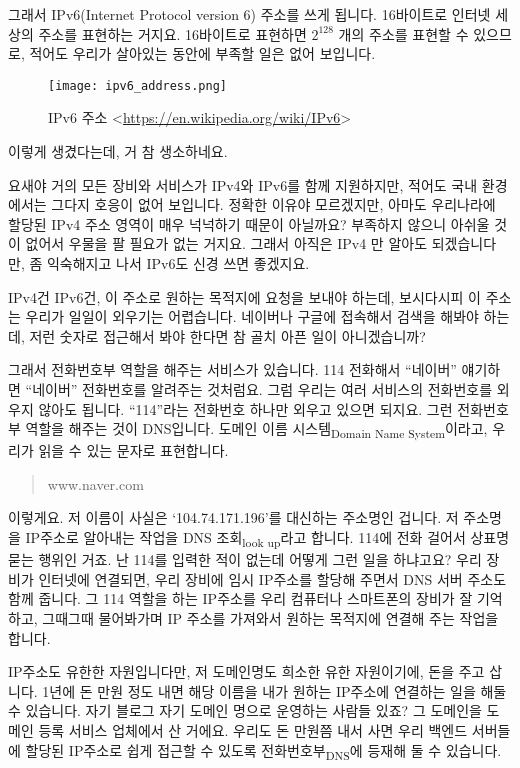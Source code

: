 \documentclass[11pt,a4paper]{article}
\begin{document}
그래서 IPv6(Internet Protocol version 6) 주소를 쓰게 됩니다. 16바이트로 인터넷 세상의 주소를 표현하는 거지요. 16바이트로 표현하면 $2^{128}$ 개의 주소를 표현할 수 있으므로, 적어도 우리가 살아있는 동안에 부족할 일은 없어 보입니다.

\begin{figure}
\centering
\texttt{[image: ipv6\_address.png]}
\caption{IPv6 주소 <\url{https://en.wikipedia.org/wiki/IPv6}>}
\end{figure}

이렇게 생겼다는데, 거 참 생소하네요.

요새야 거의 모든 장비와 서비스가 IPv4와 IPv6를 함께 지원하지만, 적어도 국내 환경에서는 그다지 호응이 없어 보입니다. 정확한 이유야 모르겠지만, 아마도 우리나라에 할당된 IPv4 주소 영역이 매우 넉넉하기 때문이 아닐까요? 부족하지 않으니 아쉬울 것이 없어서 우물을 팔 필요가 없는 거지요. 그래서 아직은 IPv4 만 알아도 되겠습니다만, 좀 익숙해지고 나서 IPv6도 신경 쓰면 좋겠지요.

IPv4건 IPv6건, 이 주소로 원하는 목적지에 요청을 보내야 하는데, 보시다시피 이 주소는 우리가 일일이 외우기는 어렵습니다. 네이버나 구글에 접속해서 검색을 해봐야 하는데, 저런 숫자로 접근해서 봐야 한다면 참 골치 아픈 일이 아니겠습니까?

그래서 전화번호부 역할을 해주는 서비스가 있습니다. 114 전화해서 ``네이버'' 얘기하면 ``네이버'' 전화번호를 알려주는 것처럼요. 그럼 우리는 여러 서비스의 전화번호를 외우지 않아도 됩니다. ``114''라는 전화번호 하나만 외우고 있으면 되지요. 그런 전화번호부 역할을 해주는 것이 DNS입니다. 도메인 이름 시스템\textsubscript{Domain Name System}이라고, 우리가 읽을 수 있는 문자로 표현합니다.

\begin{quote}
www.naver.com
\end{quote}

이렇게요. 저 이름이 사실은 `104.74.171.196'를 대신하는 주소명인 겁니다. 저 주소명을 IP주소로 알아내는 작업을 DNS 조회\textsubscript{look up}라고 합니다. 114에 전화 걸어서 상표명 묻는 행위인 거죠. 난 114를 입력한 적이 없는데 어떻게 그런 일을 하냐고요? 우리 장비가 인터넷에 연결되면, 우리 장비에 임시 IP주소를 할당해 주면서 DNS 서버 주소도 함께 줍니다. 그 114 역할을 하는 IP주소를 우리 컴퓨터나 스마트폰의 장비가 잘 기억하고, 그때그때 물어봐가며 IP 주소를 가져와서 원하는 목적지에 연결해 주는 작업을 합니다.

IP주소도 유한한 자원입니다만, 저 도메인명도 희소한 유한 자원이기에, 돈을 주고 삽니다. 1년에 돈 만원 정도 내면 해당 이름을 내가 원하는 IP주소에 연결하는 일을 해둘 수 있습니다. 자기 블로그 자기 도메인 명으로 운영하는 사람들 있죠? 그 도메인을 도메인 등록 서비스 업체에서 산 거에요. 우리도 돈 만원쯤 내서 사면 우리 백엔드 서버들에 할당된 IP주소로 쉽게 접근할 수 있도록 전화번호부\textsubscript{DNS}에 등재해 둘 수 있습니다.
\end{document}
